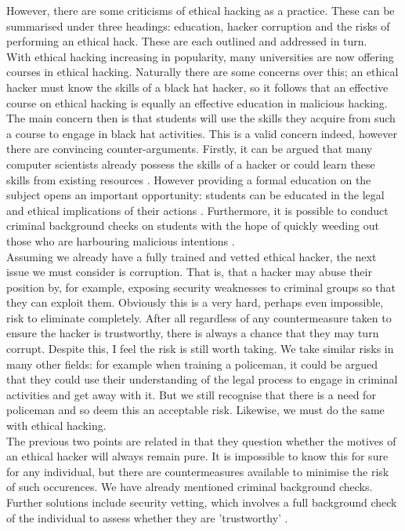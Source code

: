\documentclass{article}
\begin{document}
However, there are some criticisms of ethical hacking as a practice. These can be summarised under three headings: education, hacker corruption and the risks of performing an ethical hack. These are each outlined and addressed in turn.\\

With ethical hacking increasing in popularity, many universities are now offering courses in ethical hacking. Naturally there are some concerns over this; an ethical hacker must know the skills of a black hat hacker, so it follows that an effective course on ethical hacking is equally an effective education in malicious hacking. The main concern then is that students will use the skills they acquire from such a course to engage in black hat activities. This is a valid concern indeed, however there are convincing counter-arguments. Firstly, it can be argued that many computer scientists already possess the skills of a hacker\cite[pg.~3]{HackingTeaching} or could learn these skills from existing resources \cite[pg.~2]{CurriculumIssuesEthicalHacking}. However providing a formal education on the subject opens an important opportunity: students can be educated in the legal and ethical implications of their actions \cite[pg.~3]{HackingTeaching}. Furthermore, it is possible to conduct criminal background checks on students with the hope of quickly weeding out those who are harbouring malicious intentions \cite[pg.~2]{IsEthicalHackingEthical}.\\

Assuming we already have a fully trained and vetted ethical hacker, the next issue we must consider is corruption. That is, that a hacker may abuse their position by, for example, exposing security weaknesses to criminal groups so that they can exploit them. Obviously this is a very hard, perhaps even impossible, risk to eliminate completely. After all regardless of any countermeasure taken to ensure the hacker is trustworthy, there is always a chance that they may turn corrupt. Despite this, I feel the risk is still worth taking. We take similar risks in many other fields: for example when training a policeman, it could be argued that they could use their understanding of the legal process to engage in criminal activities and get away with it. But we still recognise that there is a need for policeman and so deem this an acceptable risk. Likewise, we must do the same with ethical hacking. \\

The previous two points are related in that they question whether the motives of an ethical hacker will always remain pure. It is impossible to know this for sure for any individual, but there are countermeasures available to minimise the risk of such occurences. We have already mentioned criminal background checks. Further solutions include security vetting, which involves a full background check of the individual to assess whether they are 'trustworthy' \cite{SecurityVetting}.\\
\end{document}
